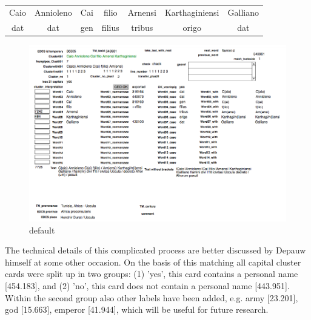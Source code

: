 \documentclass[amsthm,ebook]{saparticle}
\begin{document}
\begin{table}[htp]
\begin{center}
\begin{tabular}{ccccccc}
Caio & Annioleno & Cai & filio & Arnensi & Karthaginiensi & Galliano\\
dat & dat & gen & filius & tribus & origo & dat\\
\end{tabular}
\end{center}
\label{Example}
\end{table}%

\begin{figure}[!bp]
\centering
 \includegraphics[width=\columnwidth]{EAGLE2016FullPaperVerreth-img001.png}
\caption{default}
\label{fig:1}
\end{figure}
 




The technical details of this complicated process are better discussed by Depauw himself at some other occasion. On the
basis of this matching all capital cluster cards were split up in two groups: (1) 'yes', this card contains a personal
name [454.183], and (2) 'no', this card does not contain a personal name [443.951]. Within the second group also other
labels have been added, e.g. army [23.201], god [15.663], emperor [41.944], which will be useful for future research.
\end{document}

